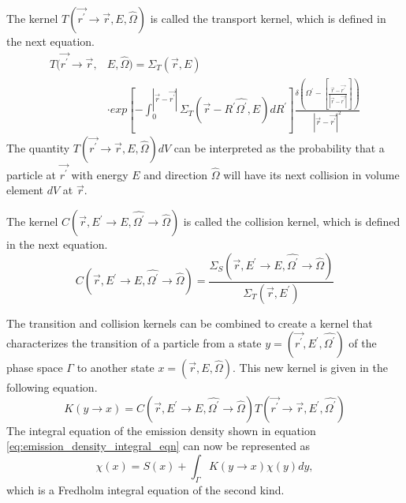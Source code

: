 The kernel $T(\vec{r^{'}} \to \vec{r},E,\hat{\Omega})$ is called the transport
kernel, which is defined in the next equation.
\begin{equation}
  \begin{split}
    T(\vec{r^{'}} \to \vec{r},&E,\hat{\Omega}) = \Sigma_T(\vec{r},E) \\
    &\cdot exp\left[-\int_0^{|\vec{r} - \vec{r^{'}}|} 
      \Sigma_T(\vec{r}-R^{'}\hat{\Omega^{'}},E)dR^{'} \right] 
    \frac{\delta \left(\Omega^{'} - \left[\frac{\vec{r} - \vec{r^{'}}}
        {|\vec{r} - \vec{r^{'}}|}\right]\right)}
    {|\vec{r} - \vec{r^{'}}|^2} 
  \end{split}
\end{equation}
The quantity $T(\vec{r^{'}} \to \vec{r},E,\hat{\Omega})dV$ can be interpreted
as the probability that a particle at $\vec{r^{'}}$ with energy $E$ and 
direction $\hat{\Omega}$ will have its next collision in volume element $dV$
at $\vec{r}$.

The kernel $C(\vec{r},E^{'} \to E,\hat{\Omega^{'}} \to \hat{\Omega})$ is called
the collision kernel, which is defined in the next equation.
\begin{equation}
  C(\vec{r},E^{'} \to E,\hat{\Omega^{'}} \to \hat{\Omega}) = 
  \frac{\Sigma_S(\vec{r},E^{'} \to E,\hat{\Omega^{'}} \to \hat{\Omega})}
       {\Sigma_T(\vec{r},E^{'})}
\end{equation}

The transition and collision kernels can be combined to create a kernel that
characterizes the transition of a particle from a state 
$y = (\vec{r^{'}},E^{'},\hat{\Omega^{'}})$ of the phase space $\Gamma$ to another 
state $x = (\vec{r},E,\hat{\Omega})$. This new kernel is given in the following 
equation.
\begin{equation}
  K(y \to x) =
  C(\vec{r},E^{'} \to E,\hat{\Omega^{'}} \to \hat{\Omega})
    T(\vec{r^{'}} \to \vec{r},E^{'},\hat{\Omega^{'}})
\end{equation}
The integral equation of the emission density shown in equation 
\ref{eq:emission_density_integral_eqn} can now be represented as
\begin{equation*}
  \chi(x) = S(x) + \int_{\Gamma} K(y \to x)\chi(y)dy,
\end{equation*}
which is a Fredholm integral equation of the second kind. 

